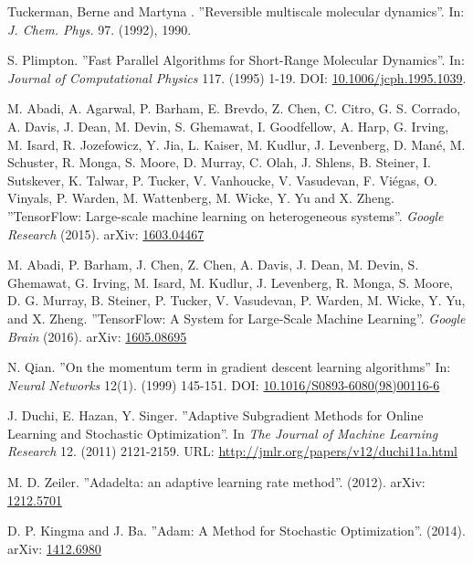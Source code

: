 \documentclass[twoside,english]{uiofysmaster}
\begin{document}
\begin{thebibliography}{56}
 Tuckerman, Berne and Martyna .
 ''Reversible multiscale molecular dynamics''.
 In: \textit{J. Chem. Phys.} 97. (1992), 1990.
 
 S. Plimpton. 
 ''Fast Parallel Algorithms for Short-Range Molecular Dynamics''.
 In: \textit{Journal of Computational Physics} 117. (1995) 1-19. 
 DOI: \href{https://doi.org/10.1006/jcph.1995.1039}{10.1006/jcph.1995.1039}. 
 
 M. Abadi, A. Agarwal, P. Barham, E. Brevdo,
 Z. Chen, C. Citro, G. S. Corrado, A. Davis,
 J. Dean, M. Devin, S. Ghemawat, I. Goodfellow,
 A. Harp, G. Irving, M. Isard, R. Jozefowicz, Y. Jia,
 L. Kaiser, M. Kudlur, J. Levenberg, D. Mané, M. Schuster,
 R. Monga, S. Moore, D. Murray, C. Olah, J. Shlens,
 B. Steiner, I. Sutskever, K. Talwar, P. Tucker,
 V. Vanhoucke, V. Vasudevan, F. Viégas,
 O. Vinyals, P. Warden, M. Wattenberg, M. Wicke,
 Y. Yu and X. Zheng.
 ''TensorFlow: Large-scale machine learning on heterogeneous systems''.
 \textit{Google Research} (2015). 
 arXiv: \href{https://arxiv.org/abs/1603.04467}{1603.04467}
 
 M. Abadi, P. Barham, J. Chen, Z. Chen, A. Davis, J. Dean,
 M. Devin, S. Ghemawat, G. Irving, M. Isard, M. Kudlur,
 J. Levenberg, R. Monga, S. Moore, D. G. Murray, B. Steiner, P. Tucker,
 V. Vasudevan, P. Warden, M. Wicke, Y. Yu, and X. Zheng.
 ''TensorFlow: A System for Large-Scale Machine Learning''.
 \textit{Google Brain} (2016).
 arXiv: \href{https://arxiv.org/abs/1605.08695}{1605.08695}
 
 N. Qian.
 ''On the momentum term in gradient descent learning algorithms''
 In: \textit{Neural Networks} 12(1). (1999) 145-151. 
 DOI: \href{https://doi.org/10.1016/S0893-6080(98)00116-6}{10.1016/S0893-6080(98)00116-6}
 
 J. Duchi, E. Hazan, Y. Singer.
 ''Adaptive Subgradient Methods for Online Learning and Stochastic Optimization''.
 In \textit{The Journal of Machine Learning Research} 12. (2011) 2121-2159. 
 URL: \href{http://jmlr.org/papers/v12/duchi11a.html}{http://jmlr.org/papers/v12/duchi11a.html}
 
 M. D. Zeiler. 
 ''Adadelta: an adaptive learning rate method''. (2012).
 arXiv: \href{https://arxiv.org/abs/1212.5701}{1212.5701}
 
 D. P. Kingma and J. Ba.
 ''Adam: A Method for Stochastic Optimization''. (2014).
 arXiv: \href{https://arxiv.org/abs/1412.6980}{1412.6980}
 

\end{thebibliography}
\end{document}
